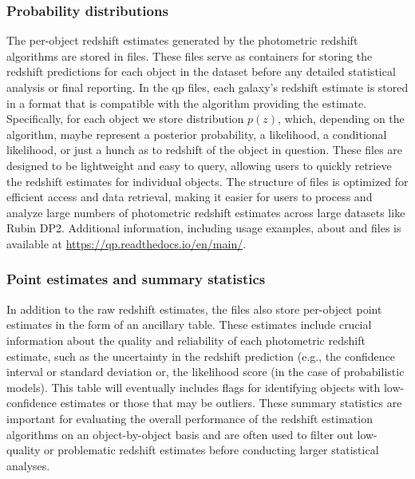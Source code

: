 \subsubsection{Probability distributions}
\label{sec:products:qp_ensembles}

The per-object redshift estimates generated by the photometric redshift algorithms are stored in  files.  These files serve as containers for storing the redshift predictions for each object in the dataset before any detailed statistical analysis or final reporting.  In the qp files, each galaxy’s redshift estimate is stored in a format that is compatible with the algorithm providing the estimate.   Specifically, for each object we store distribution $p(z)$, which, depending on the algorithm, maybe represent a posterior probability, a likelihood, a conditional likelihood, or just a hunch as to redshift of the object in question.   These  files are designed to be lightweight and easy to query, allowing users to quickly retrieve the redshift estimates for individual objects.  The structure of  files is optimized for efficient access and data retrieval, making it easier for users to process and analyze large numbers of photometric redshift estimates across large datasets like Rubin DP2.  Additional information, including usage examples, about  and  files is available at \href{https://qp.readthedocs.io/en/main/}{https://qp.readthedocs.io/en/main/}.


\subsubsection{Point estimates and summary statistics}
\label{sec:products:summary_statistics}

In addition to the raw redshift estimates, the  files also store per-object point estimates in the form of an ancillary table.  These estimates include crucial information about the quality and reliability of each photometric redshift estimate, such as the uncertainty in the redshift prediction (e.g., the confidence interval or standard deviation or, the likelihood score (in the case of probabilistic models).   This table will eventually includes flags for identifying objects with low-confidence estimates or those that may be outliers.  These summary statistics are important for evaluating the overall performance of the redshift estimation algorithms on an object-by-object basis and are often used to filter out low-quality or problematic redshift estimates before conducting larger statistical analyses.

